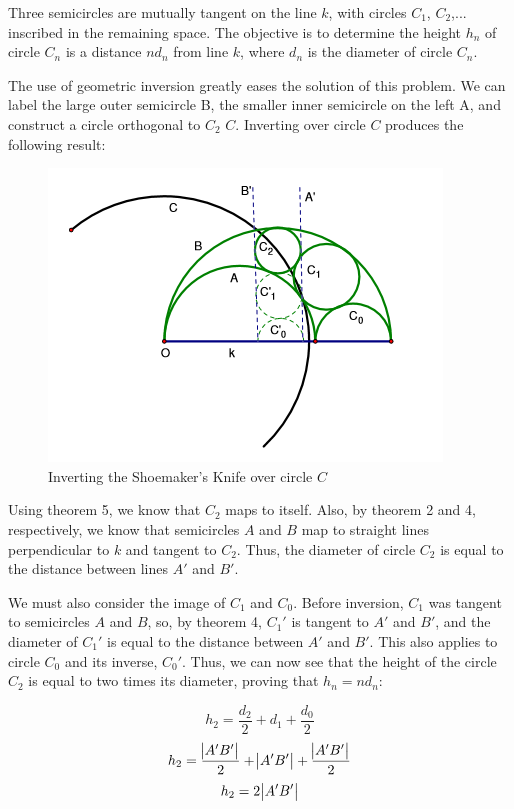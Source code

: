 \documentclass[a4paper,12pt]{article}
\numberwithin{figure}{section}
\begin{document}
        Three semicircles are mutually tangent on the line $k$, with circles $C_1$, $C_2$,... inscribed in the remaining space. The objective is to determine the height $h_n$ of circle $C_n$ is a distance $nd_n$ from line $k$, where $d_n$ is the diameter of circle $C_n$.
        
        The use of geometric inversion greatly eases the solution of this problem. We can label the large outer semicircle B, the smaller inner semicircle on the left A, and construct a circle orthogonal to $C_2$ $C$. Inverting over circle $C$ produces the following result:
        
        \begin{figure}[H]
            \centering
            \includegraphics{./pictures/SHOEMAKER_KNIFE_INVERT}
            \caption{Inverting the Shoemaker's Knife over circle $C$}
            \label{fig:knifeinv}
        \end{figure}
        
        Using theorem 5, we know that $C_2$ maps to itself. Also, by theorem 2 and 4, respectively, we know that semicircles $A$ and $B$ map to straight lines perpendicular to $k$ and tangent to $C_2$. Thus, the diameter of circle $C_2$ is equal to the distance between lines $A'$ and $B'$.
        
        We must also consider the image of $C_1$ and $C_0$. Before inversion, $C_1$ was tangent to semicircles $A$ and $B$, so, by theorem 4, $C_1'$ is tangent to $A'$ and $B'$, and the diameter of $C_1'$ is equal to the distance between $A'$ and $B'$. This also applies to circle $C_0$ and its inverse, $C_0'$. Thus, we can now see that the height of the circle $C_2$ is equal to two times its diameter, proving that $h_n=nd_n$:
        
        \[h_2=\frac{d_2}{2}+d_1+\frac{d_0}{2}\]
        \[h_2=\frac{\abs{A'B'}}{2}+\abs{A'B'}+\frac{\abs{A'B'}}{2}\]
        \[h_2=2\abs{A'B'}\]
        
\end{document}
